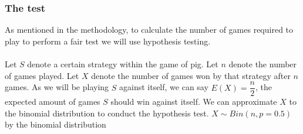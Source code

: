 \documentclass[a4paper,titlepage]{article}
\begin{document}
\subsubsection{The test}
As mentioned in the methodology, to calculate the number of games required to play to perform a fair test we will use hypothesis testing.\\ \\
Let $S$ denote a certain strategy within the game of pig. 
Let $n$ denote the number of games played.
Let $X$ denote the number of games won by that strategy after $n$ games. 
As we will be playing $S$ against itself, we can say $E(X) = 
\dfrac{n}{2}$, the expected amount of games $S$ should win against itself. 
We can approximate $X$ to the binomial distribution to conduct the hypothesis test. 
$X \sim Bin(n , p=0.5)$ 
by the binomial distribution
\end{document}
